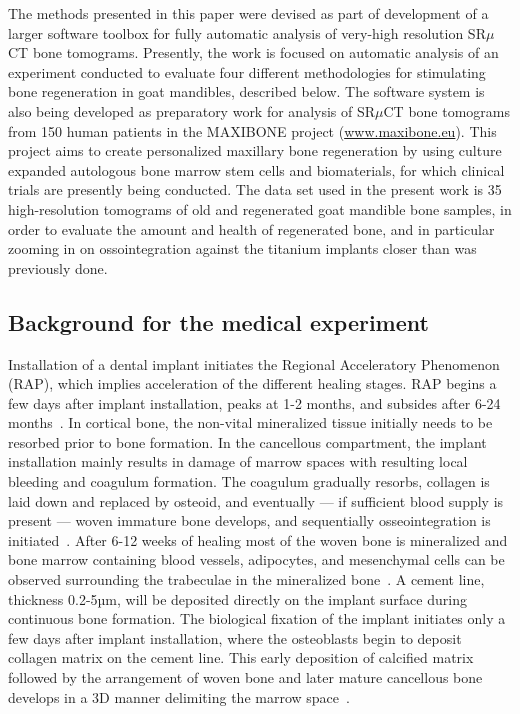 \documentclass[pdflatex,sn-mathphys]{sn-jnl}%
\theoremstyle{thmstyleone}%
\theoremstyle{thmstyletwo}%
\theoremstyle{thmstylethree}%
\begin{document}
The methods presented in this paper were devised as part of development of a larger software toolbox
for fully automatic analysis of very-high resolution SR$\mu$CT bone tomograms.
Presently, the work is focused on automatic analysis of an experiment conducted to evaluate
four different methodologies for stimulating bone regeneration in goat mandibles, described below. The software
system is also being developed as preparatory work for analysis of SR$\mu$CT bone tomograms from 150 human patients
in the MAXIBONE project (\url{www.maxibone.eu}). This project aims to create personalized maxillary bone regeneration by using culture
expanded autologous bone marrow stem cells and biomaterials, for which clinical trials are presently being conducted.
The data set used in the present work is 35 high-resolution tomograms of old and regenerated goat mandible bone samples, in order to
evaluate the amount and health of regenerated bone, and in particular zooming in on ossointegration against the titanium implants
closer than was previously done. 

\subsection{Background for the medical experiment} Installation of a dental implant initiates the
Regional Acceleratory Phenomenon (RAP), which implies acceleration of the different healing stages.
RAP begins a few days after implant installation, peaks at 1-2 months, and subsides after 6-24
months~\cite{frost1989}. In cortical bone, the non-vital mineralized tissue initially needs to be
resorbed prior to bone formation. In the cancellous compartment, the implant installation mainly
results in damage of marrow spaces with resulting local bleeding and coagulum formation. The
coagulum gradually resorbs, collagen is laid down and replaced by osteoid, and eventually --- if
sufficient blood supply is present --- woven immature bone develops, and sequentially
osseointegration is initiated~\cite{frost1989}. After 6-12 weeks of healing most of the woven bone
is mineralized and bone marrow containing blood vessels, adipocytes, and mesenchymal cells can be
observed surrounding the trabeculae in the mineralized bone~\cite{Berglundh2003, Abrahamsson2004}.
A cement line, thickness  0.2-5µm, will be deposited directly on the implant surface during
continuous bone formation. The biological fixation of the implant initiates only a few days after
implant installation, where the osteoblasts begin to deposit collagen matrix on the cement line.
This early deposition of calcified matrix followed by the arrangement of woven bone and later mature
cancellous bone develops in a 3D manner delimiting the marrow space~\cite{Franchi2004}.
\end{document}
